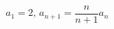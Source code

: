 \hspace*{2mm}\begin{minipage}[t]{\dimexpr\linewidth-2mm\relax}\vspace{0pt}
$a_1=2$, $a_{n+1}=\dfrac{n}{n+1}a_n$\end{minipage}

